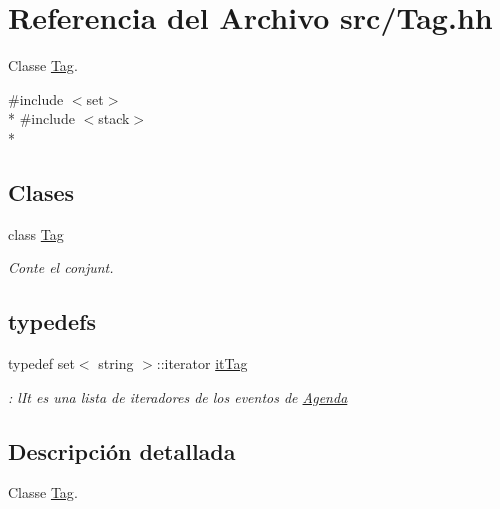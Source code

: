 \hypertarget{_tag_8hh}{}\section{Referencia del Archivo src/\+Tag.hh}
\label{_tag_8hh}


Classe \hyperlink{class_tag}{Tag}.  


{\ttfamily \#include $<$set$>$}\\*
{\ttfamily \#include $<$stack$>$}\\*
\subsection*{Clases}
\begin{DoxyCompactItemize}
\item 
class \hyperlink{class_tag}{Tag}
\begin{DoxyCompactList}\small\item\em Conte el conjunt. \end{DoxyCompactList}\end{DoxyCompactItemize}
\subsection*{\textquotesingle{}typedefs\textquotesingle{}}
\begin{DoxyCompactItemize}
\item 
\hypertarget{_tag_8hh_aa1ffaea98934d2496035b29e4bee1786}{}typedef set$<$ string $>$\+::iterator \hyperlink{_tag_8hh_aa1ffaea98934d2496035b29e4bee1786}{it\+Tag}\label{_tag_8hh_aa1ffaea98934d2496035b29e4bee1786}

\begin{DoxyCompactList}\small\item\em \+: l\+It es una lista de iteradores de los eventos de \hyperlink{class_agenda}{Agenda} \end{DoxyCompactList}\end{DoxyCompactItemize}


\subsection{Descripción detallada}
Classe \hyperlink{class_tag}{Tag}. 

